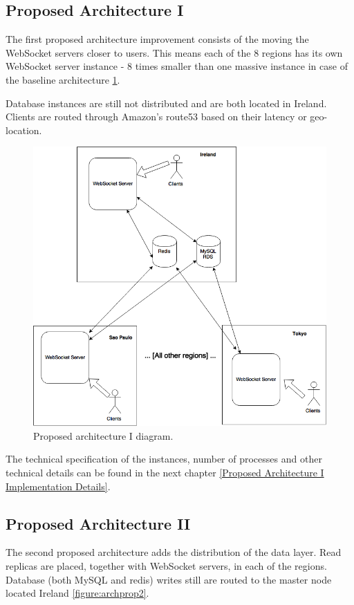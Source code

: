 \documentclass{uvamscse}
\begin{document}
\subsection{Proposed Architecture I}\label{Proposed Architecture I}
The first proposed architecture improvement consists of the moving the WebSocket servers closer to users. This means each of the 8 regions has its own WebSocket server instance - 8 times smaller than one massive instance in case of the baseline architecture \ref{figure:archprop1}.

Database instances are still not distributed and are both located in Ireland. Clients are routed through Amazon's route53 based on their latency or geo-location.

\begin{figure}[H]
\centering
\includegraphics[scale=0.3]{archprop1}
\caption{Proposed architecture I diagram.}
\label{figure:archprop1}
\end{figure}

The technical specification of the instances, number of processes and other technical details can be found in the next chapter \ref{Proposed Architecture I Implementation Details}.

\subsection{Proposed Architecture II}\label{Proposed Architecture II}
The second proposed architecture adds the distribution of the data layer. Read replicas are placed, together with WebSocket servers, in each of the regions. Database (both MySQL and redis) writes still are routed to the master node located Ireland \ref{figure:archprop2}.
\end{document}
